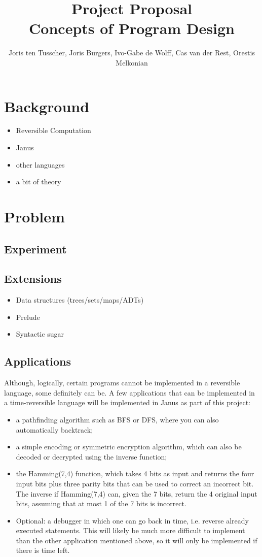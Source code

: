 \documentclass[12pt,a4paper]{article}
\title{\textbf{Project Proposal \\ \small{Concepts of Program Design}}}
\author{\small{Joris ten Tusscher, Joris Burgers, Ivo-Gabe de Wolff, Cas van der Rest, Orestis Melkonian}}
\date{}
\begin{document}
\maketitle

\section{Background}
\begin{itemize}
	\item{Reversible Computation}
	\item{Janus}
	\item{other languages}
	\item{a bit of theory}
\end{itemize}

\section{Problem}
	\subsection{Experiment}
	
	\subsection{Extensions}
	\begin{itemize}
		\item{Data structures (trees/sets/maps/ADTs)}
		\item{Prelude}
		\item{Syntactic sugar}
	\end{itemize}
	
	\subsection{Applications}
	Although, logically, certain programs cannot be implemented in a reversible language, some definitely can be. A few applications that can be implemented in a time-reversible language will be implemented in Janus as part of this project:
	\begin{itemize}
		\item
			a pathfinding algorithm such as BFS or DFS, where you can also automatically backtrack;
	        \item
	        		a simple encoding or symmetric encryption algorithm, which can also be decoded or decrypted using the inverse function;
	        	\item
			the Hamming(7,4) function, which takes 4 bits as input and returns the four input bits plus three parity bits that can be used to correct an incorrect bit\cite{hamming}. The inverse if Hamming(7,4) can, given the 7 bits, return the 4 original input bits, assuming that at most 1 of the 7 bits is incorrect.
        		\item
			Optional: a debugger in which one can go back in time, i.e. reverse already executed statements. This will likely be much more difficult to implement than the other application mentioned above, so it will only be implemented if there is time left.
	\end{itemize}
	
\end{document}

